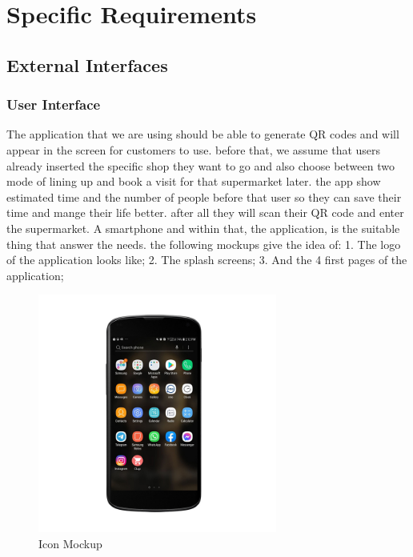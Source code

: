 \section{Specific Requirements}

\subsection{External Interfaces}
\subsubsection{User Interface}
% 
The application that we are using should be able to generate QR codes and will appear in the screen for customers to use. before that, we assume that users already inserted the specific shop they want to go and also choose between two mode of lining up and book a visit for that supermarket later. the app show  estimated time and the number of people before that user so they can save their time and  mange their life better. after all they will scan their QR code and enter the supermarket.
A smartphone and within that, the application, is the suitable thing that answer the needs.
the following mockups give the idea of:
1. The logo of the application looks like;
2. The splash screens;
3. And the 4 first pages of the application;
\begin{figure}[H]
  \centering
  \includegraphics[width=0.7\textwidth,keepaspectratio]{images/1.jpg}
  \caption{Icon Mockup}
\end{figure}
